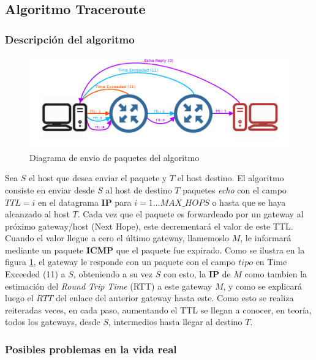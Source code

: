 \subsection{Algoritmo Traceroute}

\subsubsection{Descripción del algoritmo}

\begin{figure}[ht]
	\begin{center}
		\includegraphics[width=0.8\columnwidth]{imagenes/diagrama_1.jpg}
		\caption{Diagrama de envio de paquetes del algoritmo}
		\label{fig:diagramasimple}
	\end{center}
\end{figure}

Sea $S$ el host que desea enviar el paquete y $T$ el host destino.
El algoritmo consiste en enviar desde $S$ al host de destino $T$ paquetes
\emph{echo} con el campo $TTL=i$ en el datagrama \textbf{IP} para $i=1 \dots
MAX\_HOPS$ o hasta que se haya alcanzado al host $T$. Cada vez que el paquete
es forwardeado por un gateway al próximo gateway/host (Next Hope), este decrementará el
valor de este TTL. Cuando el valor llegue a cero el último gateway, llamemoslo
$M$, le informará mediante un paquete \textbf{ICMP} que el paquete fue expirado.
Como se ilustra en la figura \ref{fig:diagramasimple}, el gateway le responde con un paquete con el campo $tipo$ en
Time Exceeded (11) a $S$, obteniendo a su vez $S$ con esto, la \textbf{IP} de $M$ como
tambien la estimación del \textit{Round
Trip Time} (RTT) a este gateway $M$, y como se explicará luego el $RTT$ del enlace
del anterior gateway hasta este. Como esto se realiza reiteradas veces, en
cada paso, aumentando el TTL se llegan a conocer, en teoría, todos los
gateways, desde $S$, intermedios hasta llegar al destino $T$.

\subsubsection{Posibles problemas en la vida real}


